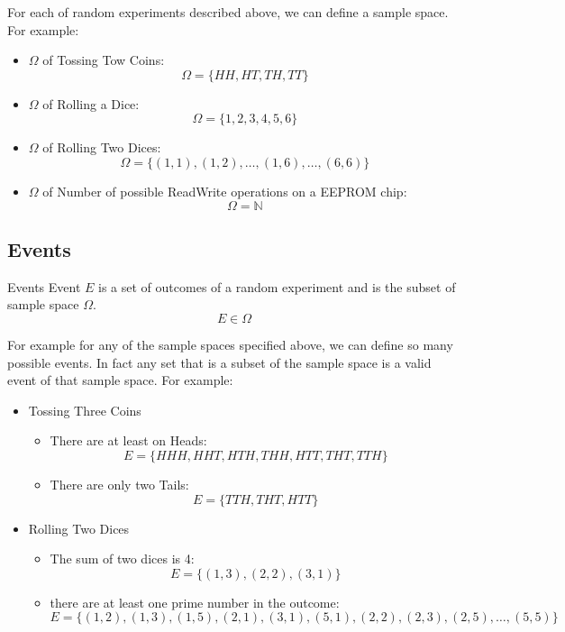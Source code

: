For each of random experiments described above, we can define a sample space. For example:

\begin{itemize}
\item $\Omega$ of Tossing Tow Coins: $$\Omega = \{ HH,HT,TH,TT \}$$
\item $\Omega$ of Rolling a Dice: $$\Omega = \{ 1,2,3,4,5,6 \}$$
\item $\Omega$ of Rolling Two Dices: $$\Omega = \{ (1,1),(1,2), \ldots, (1,6), \ldots ,(6,6)  \}$$
\item $\Omega$ of Number of possible ReadWrite operations on a EEPROM chip: $$\Omega = \mathbb{N}$$
\end{itemize}



\subsection{Events}
\begin{defbox}{Events}
Event $E$ is a set of outcomes of a random experiment and is the subset of sample space $\Omega$. 
$$E \in \Omega$$
\end{defbox}


For example for any of the sample spaces specified above, we can define so many possible events. In fact any set that is a subset of the sample space is a valid event of that sample space. For example:

\begin{itemize}

\item Tossing Three Coins
\begin{itemize}
\item There are at least on Heads: $$E = \{ HHH,HHT,HTH,THH,HTT,THT,TTH \}$$
\item There are only two Tails: $$E = \{ TTH,THT,HTT \}$$
\end{itemize}

\item Rolling Two Dices
\begin{itemize}
\item The sum of two dices is 4: $$E = \{ (1,3),(2,2),(3,1) \}$$
\item there are at least one prime number in the outcome:
$$E = \{ (1,2),(1,3),(1,5),(2,1),(3,1),(5,1),(2,2),(2,3),(2,5), \ldots ,(5,5)\}$$
\end{itemize}

\end{itemize}

